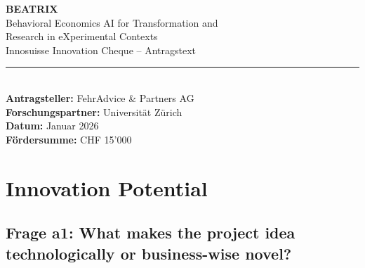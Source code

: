 \documentclass[11pt,a4paper]{article}
\begin{document}
\begin{center}
    {\LARGE\bfseries\color{fehrblue} BEATRIX}\\[0.5em]
    {\large Behavioral Economics AI for Transformation and\\Research in eXperimental Contexts}\\[1.5em]
    {\Large Innosuisse Innovation Cheque -- Antragstext}\\[1em]
    \rule{0.6\textwidth}{0.5pt}\\[1em]
    {\normalsize
    \textbf{Antragsteller:} FehrAdvice \& Partners AG\\
    \textbf{Forschungspartner:} Universität Zürich\\
    \textbf{Datum:} Januar 2026\\
    \textbf{Fördersumme:} CHF 15'000
    }
\end{center}

\vspace{1em}

\begin{center}
\end{center}

\vspace{2em}

\tableofcontents
\newpage

\section{Innovation Potential}

\subsection{Frage a1: What makes the project idea technologically or business-wise novel?}
\end{document}
